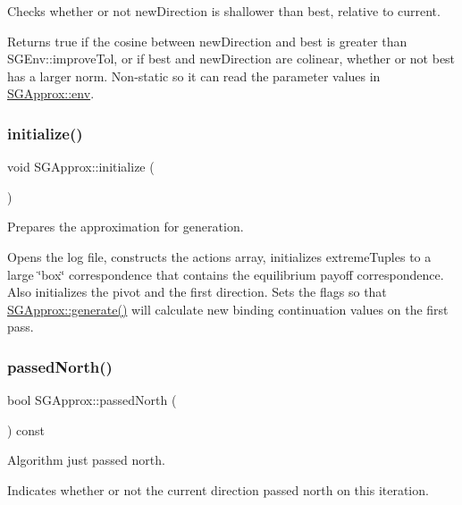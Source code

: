 Checks whether or not new\+Direction is shallower than best, relative to current. 

Returns true if the cosine between new\+Direction and best is greater than S\+G\+Env\+::improve\+Tol, or if best and new\+Direction are colinear, whether or not best has a larger norm. Non-\/static so it can read the parameter values in \hyperlink{classSGApprox_a6597417918c1e6c764f4f943c72af781}{S\+G\+Approx\+::env}. \mbox{\label{classSGApprox_a4bca21d3b688b3ca283c6778c593563a}} 
\subsubsection{\texorpdfstring{initialize()}{initialize()}}
{\footnotesize\ttfamily void S\+G\+Approx\+::initialize (\begin{DoxyParamCaption}{ }\end{DoxyParamCaption})}



Prepares the approximation for generation. 

Opens the log file, constructs the actions array, initializes extreme\+Tuples to a large \char`\"{}box\char`\"{} correspondence that contains the equilibrium payoff correspondence. Also initializes the pivot and the first direction. Sets the flags so that \hyperlink{classSGApprox_a9cf7330f7cab3f454b0850e778d132fa}{S\+G\+Approx\+::generate()} will calculate new binding continuation values on the first pass. \mbox{\label{classSGApprox_aa2ecb39d9938587e67bb07b9b445d6d4}} 
\subsubsection{\texorpdfstring{passed\+North()}{passedNorth()}}
{\footnotesize\ttfamily bool S\+G\+Approx\+::passed\+North (\begin{DoxyParamCaption}{ }\end{DoxyParamCaption}) const\hspace{0.3cm}{\ttfamily [inline]}}



Algorithm just passed north. 

Indicates whether or not the current direction passed north on this iteration. \mbox{\label{classSGApprox_abbd46d241613c871ecba24e10e115c56}} 

